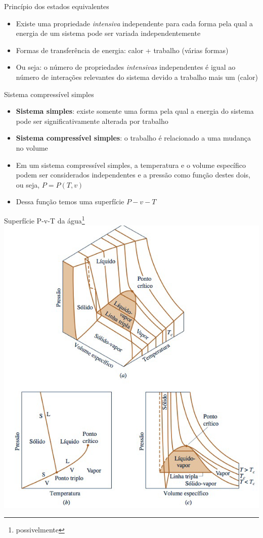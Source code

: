 \documentclass[t,%
brazilian,%
11pt,%
aspectratio=169,%
table%
]{beamer}
\begin{document}
\begin{frame}{Princípio dos estados equivalentes}
\begin{itemize}
    \item Existe uma propriedade \textit{intensiva} independente para cada forma pela qual a energia de um sistema pode ser variada independentemente 
    \item Formas de transferência de energia: calor + trabalho (várias formas)
    \item Ou seja: o número de propriedades \textit{intensivas} independentes é igual  ao número de interações relevantes do sistema devido a trabalho mais um (calor)
\end{itemize}
\begin{block}
    {Sistema compressível simples}
    \begin{itemize}
        \item \textbf{Sistema simples}: existe somente uma forma pela qual a energia do sistema pode ser significativamente alterada por trabalho
        \item \textbf{Sistema compressível simples}: o trabalho é relacionado a uma mudança no volume
        \item Em um sistema compressível simples, a temperatura e o volume específico podem ser considerados independentes e a pressão como função destes dois, ou seja, 
        \(
        P= P(T,v)
        \)
        \item Dessa função temos uma superfície \(P-v-T\)
    \end{itemize}
\end{block}
\end{frame}

\begin{frame}{Superfície P-v-T da água\footnote{possivelmente}}
\centering
\includegraphics[height=7.5cm-5pt]{images/pvt.png}
\end{frame}
\end{document}
